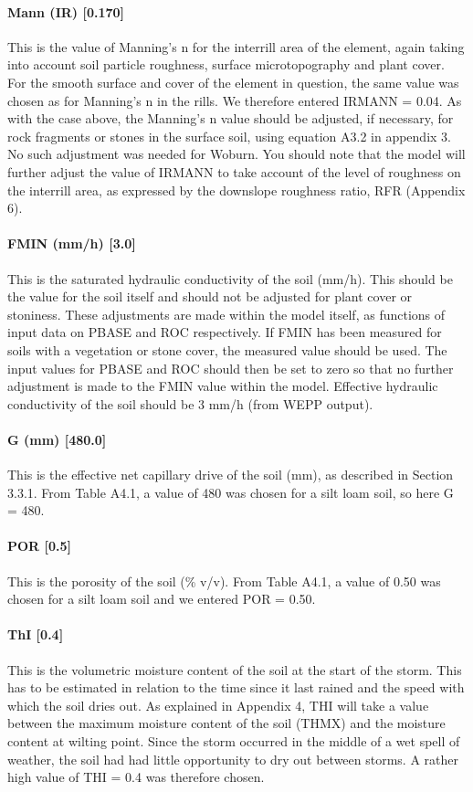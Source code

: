 \paragraph{Mann (IR) [0.170]}
This is the value of Manning's n for the interrill area of the element, again
taking into account soil particle roughness, surface microtopography and plant
cover. For the smooth surface and cover of the element in question, the same
value was chosen as for Manning's n in the rills. We therefore entered IRMANN =
0.04.
As with the case above, the Manning's n value should be adjusted, if necessary,
for rock fragments or stones in the surface soil, using equation A3.2 in
appendix 3. No such adjustment was needed for Woburn. You should note that the
model will further adjust the value of IRMANN to take account of the level of
roughness on the interrill area, as expressed by the downslope roughness ratio,
RFR (Appendix 6).
 
\paragraph{FMIN (mm/h) [3.0]}
This is the saturated hydraulic conductivity of the soil (mm/h). This should be
the value for the soil itself and should not be adjusted for plant cover or
stoniness. These adjustments are made within the model itself, as functions of
input data on PBASE and ROC respectively. If FMIN has been measured for soils
with a vegetation or stone cover, the measured value should be used. The input
values for PBASE and ROC should then be set to zero so that no further
adjustment is made to the FMIN value within the model.
Effective hydraulic conductivity of the soil should be 3 mm/h (from WEPP
output).
 
\paragraph{G (mm) [480.0]}
This is the effective net capillary drive of the soil (mm), as described in
Section 3.3.1. From Table A4.1, a value of 480 was chosen for a silt loam soil,
so here G = 480.
 
\paragraph{POR [0.5]}
This is the porosity of the soil (\% v/v). From Table A4.1, a value of 0.50 was
chosen for a silt loam soil and we entered POR = 0.50.
 
\paragraph{ThI [0.4]}
This is the volumetric moisture content of the soil at the start of the storm.
This has to be estimated in relation to the time since it last rained and the
speed with which the soil dries out. As explained in Appendix 4, THI will take a
value between the maximum moisture content of the soil (THMX) and the moisture
content at wilting point. Since the storm occurred in the middle of a wet spell
of weather, the soil had had little opportunity to dry out between storms. A
rather high value of THI = 0.4 was therefore chosen.

